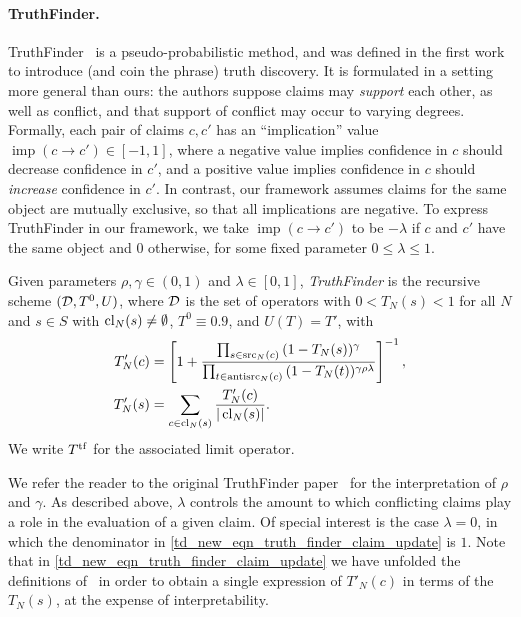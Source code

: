 \paragraph{TruthFinder.} TruthFinder~\cite{yin2008} is a pseudo-probabilistic
method, and was defined in the first work to introduce (and coin the phrase)
truth discovery. It is formulated in a setting more general than ours: the
authors suppose claims may \emph{support} each other, as well as conflict, and
that support of conflict may occur to varying degrees. Formally, each pair of
claims $c, c'$ has an ``implication'' value $\operatorname{imp}(c \to c') \in
[-1, 1]$, where a negative value implies confidence in $c$ should decrease
confidence in $c'$, and a positive value implies confidence in $c$ should
\emph{increase} confidence in $c'$. In contrast, our framework assumes claims
for the same object are mutually exclusive, so that all implications are
negative. To express TruthFinder in our framework, we take
$\operatorname{imp}(c \to c')$ to be $-\lambda$ if $c$ and $c'$ have the same
object and $0$ otherwise, for some fixed parameter $0 \le \lambda \le 1$.

\begin{definition}
    Given parameters $\rho, \gamma \in (0, 1)$ and $\lambda \in [0, 1]$,
    \emph{TruthFinder} is the recursive scheme $(\mathcal{D}, T^0, U)$, where $\mathcal{D}$ is
    the set of operators with $0 < T_N(s) < 1$ for all $N$ and $s \in S$ with
    $\operatorname{cl}_N(s) \ne \emptyset$, $T^0 \equiv 0.9$, and $U(T) = T'$, with
    \begin{align}
        \label{td_new_eqn_truth_finder_claim_update}
        T'_N(c) &= \left[
            1 +
            \frac{
                \prod_{s \in \operatorname{src}_N(c)}{(1 - T_N(s))^\gamma}
            }{
                \prod_{t \in \operatorname{antisrc}_N(c)}{(1 - T_N(t))^{\gamma\rho\lambda}}
            }
        \right]^{-1}, \\
        T'_N(s) &= \sum_{c \in \operatorname{cl}_N(s)}{
            \frac{T'_N(c)}{|\operatorname{cl}_N(s)|}
        }.
    \end{align}
    We write $T^{\operatorname{tf}}$ for the associated limit operator.
\end{definition}

We refer the reader to the original TruthFinder paper~\cite{yin2008} for the
interpretation of $\rho$ and $\gamma$. As described above, $\lambda$ controls
the amount to which conflicting claims play a role in the evaluation of a given
claim. Of special interest is the case $\lambda = 0$, in which the denominator
in \cref{td_new_eqn_truth_finder_claim_update} is $1$. Note that in
\cref{td_new_eqn_truth_finder_claim_update} we have unfolded the definitions
of~\cite{yin2008} in order to obtain a single expression of $T'_N(c)$ in terms
of the $T_N(s)$, at the expense of interpretability.

